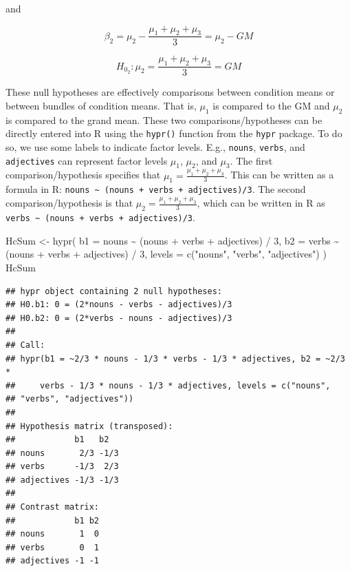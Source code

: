 \documentclass[
  12pt,
]{krantz}
\newenvironment{Shaded}{\begin{snugshade}}{\end{snugshade}}
\newcommand{\AttributeTok}[1]{\textcolor[rgb]{0.77,0.63,0.00}{#1}}
\newcommand{\DecValTok}[1]{\textcolor[rgb]{0.00,0.00,0.81}{#1}}
\newcommand{\FunctionTok}[1]{\textcolor[rgb]{0.00,0.00,0.00}{#1}}
\newcommand{\NormalTok}[1]{#1}
\newcommand{\OtherTok}[1]{\textcolor[rgb]{0.56,0.35,0.01}{#1}}
\newcommand{\SpecialCharTok}[1]{\textcolor[rgb]{0.00,0.00,0.00}{#1}}
\newcommand{\StringTok}[1]{\textcolor[rgb]{0.31,0.60,0.02}{#1}}
\theoremstyle{definition}
\theoremstyle{definition}
\theoremstyle{definition}
\theoremstyle{definition}
\theoremstyle{remark}
\begin{document}
\noindent
and

\begin{equation}
\beta_2 = \mu_2 - \frac{\mu_1+\mu_2+\mu_3}{3} = \mu_2 - GM
\end{equation}

\begin{equation}
H_{0_2}: \mu_2 = \frac{\mu_1+\mu_2+\mu_3}{3} = GM
\end{equation}

These null hypotheses are effectively comparisons between condition means or between bundles of condition means. That is, \(\mu_1\) is compared to the GM and \(\mu_2\) is compared to the grand mean. These two comparisons/hypotheses can be directly entered into R using the \texttt{hypr()} function from the \texttt{hypr} package.
To do so, we use some labels to indicate factor levels. E.g., \texttt{nouns}, \texttt{verbs}, and \texttt{adjectives} can represent factor levels \(\mu_1\), \(\mu_2\), and \(\mu_3\). The first comparison/hypothesis specifies that \(\mu_1 = \frac{\mu_1+\mu_2+\mu_3}{3}\). This can be written as a formula in R: \texttt{nouns\ \textasciitilde{}\ (nouns\ +\ verbs\ +\ adjectives)/3}. The second comparison/hypothesis is that \(\mu_2 = \frac{\mu_1+\mu_2+\mu_3}{3}\), which can be written in R as \texttt{verbs\ \textasciitilde{}\ (nouns\ +\ verbs\ +\ adjectives)/3}.

\begin{Shaded}
\begin{Highlighting}[]
\NormalTok{HcSum }\OtherTok{\textless{}{-}} \FunctionTok{hypr}\NormalTok{(}
  \AttributeTok{b1 =}\NormalTok{ nouns }\SpecialCharTok{\textasciitilde{}}\NormalTok{ (nouns }\SpecialCharTok{+}\NormalTok{ verbs }\SpecialCharTok{+}\NormalTok{ adjectives) }\SpecialCharTok{/} \DecValTok{3}\NormalTok{,}
  \AttributeTok{b2 =}\NormalTok{ verbs }\SpecialCharTok{\textasciitilde{}}\NormalTok{ (nouns }\SpecialCharTok{+}\NormalTok{ verbs }\SpecialCharTok{+}\NormalTok{ adjectives) }\SpecialCharTok{/} \DecValTok{3}\NormalTok{,}
  \AttributeTok{levels =} \FunctionTok{c}\NormalTok{(}\StringTok{"nouns"}\NormalTok{, }\StringTok{"verbs"}\NormalTok{, }\StringTok{"adjectives"}\NormalTok{)}
\NormalTok{)}
\NormalTok{HcSum}
\end{Highlighting}
\end{Shaded}

\begin{verbatim}
## hypr object containing 2 null hypotheses:
## H0.b1: 0 = (2*nouns - verbs - adjectives)/3
## H0.b2: 0 = (2*verbs - nouns - adjectives)/3
## 
## Call:
## hypr(b1 = ~2/3 * nouns - 1/3 * verbs - 1/3 * adjectives, b2 = ~2/3 * 
##     verbs - 1/3 * nouns - 1/3 * adjectives, levels = c("nouns", 
## "verbs", "adjectives"))
## 
## Hypothesis matrix (transposed):
##            b1   b2  
## nouns       2/3 -1/3
## verbs      -1/3  2/3
## adjectives -1/3 -1/3
## 
## Contrast matrix:
##            b1 b2
## nouns       1  0
## verbs       0  1
## adjectives -1 -1
\end{verbatim}
\end{document}
